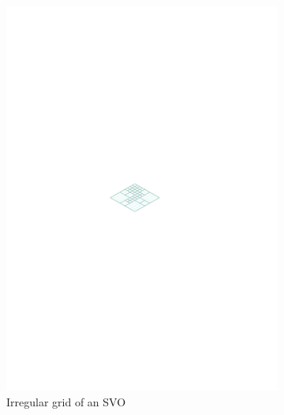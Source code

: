 \begin{figure}
\begin{subfigure}{.33\textwidth}
  \includegraphics[scale=1]{figures/svo.pdf}
  \caption{Irregular grid of an SVO}
  \label{fig:svo}
\end{subfigure}
\begin{subfigure}{.33\textwidth}
  \centering

\end{subfigure}
\end{figure}
